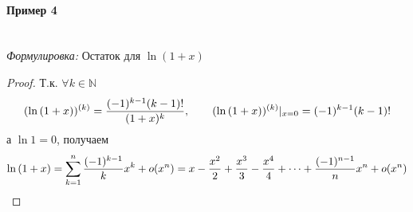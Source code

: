\documentclass{article}
\let\vanillaparagraph\paragraph
\renewcommand{\paragraph}[1]{\vanillaparagraph{#1}\mbox{}\\}
\begin{document}
\paragraph{Пример 4}

\textit{Формулировка: }
Остаток для $\ln{\left(1 + x\right)}$

\begin{proof}
Т.к. $\forall k \in \mathbb{N}$
\begin{equation}
(\ln{\left(1 + x\right)})^{(k)} = \frac{(-1)^{k-1}(k-1)!}{(1+x)^k}, \qquad (\ln{\left(1 + x\right)})^{(k)}\arrowvert_{x=0} = (-1)^{k-1}(k-1)!\notag
\end{equation}
а $\ln{1} = 0$, получаем
\begin{equation}
\ln{\left(1 + x\right)} = \sum_{k=1}^n \frac{(-1)^{k-1}}{k} x^k + o(x^n) = x - \frac{x^2} {2} + \frac{x^3} {3} - \frac{x^4} {4} + \dots + \frac{(-1)^{n-1} }{n} x^n + o(x^n)\notag
\end{equation}
\end{proof}
\end{document}
